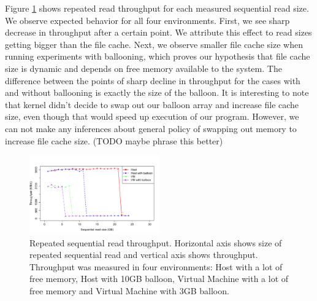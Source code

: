 Figure \ref{fig:p3graph} shows repeated read throughput for each measured sequential read size. We observe expected behavior for all four environments. First, we see sharp decrease in throughput after a certain point. We attribute this effect to read sizes getting bigger than the file cache. Next, we observe smaller file cache size when running experiments with ballooning, which proves our hypothesis that file cache size is dynamic and depends on free memory available to the system. The difference between the points of sharp decline in throughput for the cases with and without ballooning is exactly the size of the balloon. It is interesting to note that kernel didn't decide to swap out our balloon array and increase file cache size, even though that would speed up execution of our program. However, we can not make any inferences about general policy of swapping out memory to increase file cache size. (TODO maybe phrase this better)

\begin{figure}[ht!]
	\includegraphics[width=0.5\textwidth]{./figures/p3.pdf}
	\caption{Repeated sequential read throughput. Horizontal axis shows size of repeated sequential read and vertical axis shows throughput. Throughput was measured in four environments: Host with a lot of free memory, Host with 10GB balloon, Virtual Machine with a lot of free memory and Virtual Machine with 3GB balloon.}
	\label{fig:p3graph}
\end{figure}

